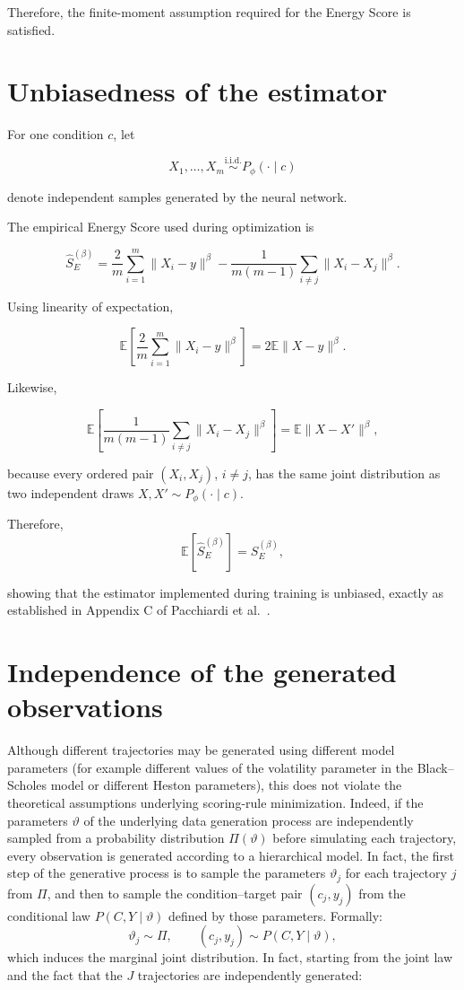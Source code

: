 \begin{appendices}
Therefore, the finite-moment assumption required for the Energy Score is satisfied.

\section{Unbiasedness of the estimator}

For one condition $c$, let

\[
X_1,\ldots,X_m
\stackrel{\mathrm{i.i.d.}}{\sim}
P_\phi(\cdot\mid c)
\]

denote independent samples generated by the neural network.

The empirical Energy Score used during optimization is

\[
\widehat S_E^{(\beta)}
=
\frac{2}{m}
\sum_{i=1}^m
\|X_i-y\|^\beta
-
\frac{1}{m(m-1)}
\sum_{i\neq j}
\|X_i-X_j\|^\beta.
\]

Using linearity of expectation,

\[
\mathbb E
\left[
\frac{2}{m}
\sum_{i=1}^m
\|X_i-y\|^\beta
\right]
=
2
\mathbb E
\|X-y\|^\beta.
\]

Likewise,

\[
\mathbb E
\left[
\frac1{m(m-1)}
\sum_{i\neq j}
\|X_i-X_j\|^\beta
\right]
=
\mathbb E
\|X-X'\|^\beta,
\]

because every ordered pair
$(X_i,X_j)$,
$i\neq j$,
has the same joint distribution as two independent draws
$X,X'\sim P_\phi(\cdot\mid c)$.

Therefore,
\[
\mathbb E
\left[
\widehat S_E^{(\beta)}
\right]
=
S_E^{(\beta)},
\]


showing that the estimator implemented during training is unbiased, exactly as established in Appendix C of Pacchiardi et al.~\cite{srforgan:srforgan}.


\section{Independence of the generated observations}


Although different trajectories may be generated using different model parameters (for example different values of the volatility parameter in the Black--Scholes model or different Heston parameters), this does not violate the theoretical assumptions underlying scoring-rule minimization. Indeed, if the parameters $\vartheta$ of the underlying data generation process are independently 
sampled from a probability distribution $\Pi(\vartheta)$ before simulating each trajectory, every observation is generated according to a hierarchical model. In fact, the first step of the generative process is to sample the parameters $\vartheta_j$ for each trajectory $j$ from $\Pi$, and then to sample the condition--target pair $(c_j,y_j)$ from the conditional law $P(C,Y \mid\vartheta)$ defined by those parameters. Formally:
\[
\vartheta_j\sim\Pi,
\qquad
(c_j,y_j)\sim P(C,Y \mid\vartheta),
\]
which induces the marginal joint distribution. In fact, starting from the joint law and the fact that the $J$ trajectories 
are independently generated:


\end{appendices}
